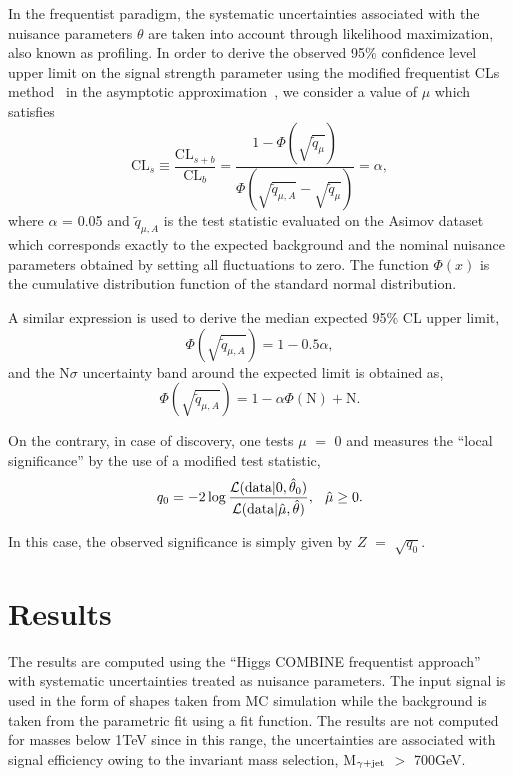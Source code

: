 In the frequentist paradigm, the systematic uncertainties associated with the nuisance parameters $\theta$
are taken into account through likelihood maximization, also known as profiling. In order to derive the observed 95$\%$ confidence level upper limit on
the signal strength parameter using the modified frequentist CLs method~\cite{Junk:1999kv, Read:2002hq} in the asymptotic approximation~\cite{Cowan:2010js},
we consider a value of $\mu$ which satisfies
\begin{equation}
\textrm{CL}_{s} \equiv \frac{\textrm{CL}_{s+b}}{\textrm{CL}_{b}} = \frac{1 - \Phi(\sqrt{\tilde{q}_{\mu}})}{\Phi({\sqrt{\tilde{q}_{\mu,A}}} - {\sqrt{\tilde{q}_{\mu}}})} = \alpha,
\end{equation}
where $\alpha$ = 0.05 and $\tilde{q}_{\mu,A}$ is the test statistic evaluated on the Asimov dataset~\cite{Asimov} which corresponds exactly to
the expected background and the nominal nuisance parameters obtained by setting all fluctuations to zero. The function $\Phi(x)$ is the cumulative distribution
function of the standard normal distribution.

A similar expression is used to derive the median expected 95$\%$ CL upper limit,
\begin{equation}
\Phi(\sqrt{\tilde{q}_{\mu,A}}) = 1 - 0.5\alpha,
\end{equation}
and the N$\sigma$ uncertainty band around the expected limit is obtained as,
\begin{equation}
\Phi(\sqrt{\tilde{q}_{\mu,A}}) = 1 - \alpha\Phi(\textrm{N}) + \textrm{N}.
\end{equation}

On the contrary, in case of discovery, one tests $\mu$ $=$ 0 and measures the ``local significance'' by the use of a modified test statistic,
\begin{equation}
{q}_{0} = -2 \log \frac{\mathcal{L}(\textrm{data}|0,\hat{\theta}_{0})}{\mathcal{L}(\textrm{data}|\hat{\mu},\hat{\theta})}, \hspace{0.1in} \hat{\mu} \geq 0.
\end{equation}

In this case, the observed significance is simply given by $Z$ $=$ $\sqrt{q_{0}}$.
\section{Results}
The results are computed using the ``Higgs COMBINE frequentist approach'' with systematic uncertainties treated as nuisance parameters. The input signal
is used in the form of shapes taken from MC simulation while the background is taken from the parametric fit using a fit function. The results are not computed
for masses below 1\unit{TeV} since in this range, the uncertainties are associated with signal efficiency owing to the invariant mass selection,
M$_{\gamma+\mathrm{jet}}$ $>$ 700\unit{GeV}. 
